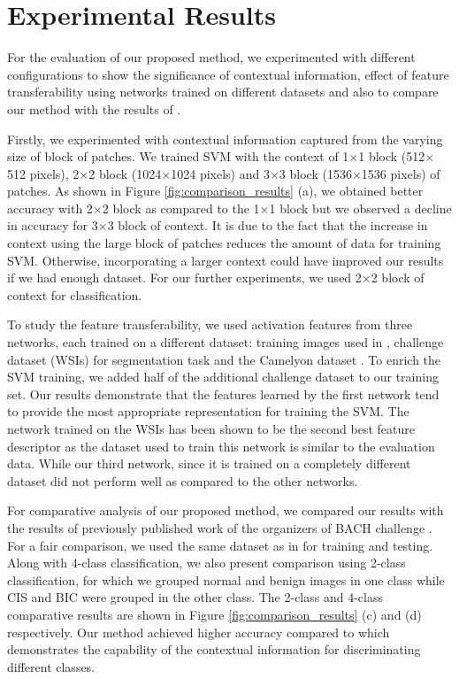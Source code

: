 \documentclass[runningheads,a4paper]{llncs}
\begin{document}
\section{Experimental Results}

For the evaluation of our proposed method, we experimented with different configurations to show the significance of contextual information, effect of feature transferability using networks trained on different datasets and also to compare our method with the results of \cite{araujo2017classification}.

Firstly, we experimented with contextual information captured from the varying size of block of patches. We trained SVM with the context of 1$\times$1 block (512$\times$512 pixels), 2$\times$2 block (1024$\times$1024 pixels) and 3$\times$3 block (1536$\times$1536 pixels) of patches. As shown in Figure \ref{fig:comparison_results} (a), we obtained better accuracy with 2$\times$2 block as compared to the 1$\times$1 block but we observed a decline in accuracy for 3$\times$3 block of context. It is due to the fact that the increase in context using the large block of patches reduces the amount of data for training SVM. Otherwise, incorporating a larger context could have improved our results if we had enough dataset. For our further experiments, we used 2$\times$2 block of context for classification.

To study the feature transferability, we used activation features from three networks, each trained on a different dataset: training images used in \cite{araujo2017classification}, challenge dataset (WSIs) for segmentation task and the Camelyon dataset \cite{bejnordi2017diagnostic}. To enrich the SVM training, we added half of the additional challenge dataset to our training set. Our results demonstrate that the features learned by the first network tend to provide the most appropriate representation for training the SVM. The network trained on the WSIs has been shown to be the second best feature descriptor as the dataset used to train this network is similar to the evaluation data. While our third network, since it is trained on a completely different dataset did not perform well as compared to the other networks.
  
For comparative analysis of our proposed method, we compared our results with the results of previously published work of the organizers of BACH challenge \cite{araujo2017classification}. For a fair comparison, we used the same dataset as in \cite{araujo2017classification} for training and testing. Along with 4-class classification, we also present comparison using 2-class classification, for which we grouped normal and benign images in one class while CIS and BIC were grouped in the other class. The 2-class and 4-class comparative results are shown in Figure \ref{fig:comparison_results} (c) and (d) respectively. Our method achieved higher accuracy compared to \cite{araujo2017classification} which demonstrates the capability of the contextual information for discriminating different classes.
\end{document}
